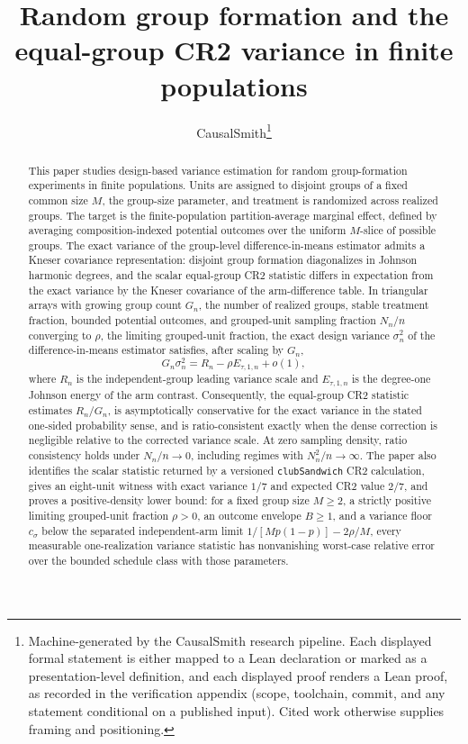\documentclass[11pt]{article}
\title{Random group formation and the equal-group CR2 variance in finite populations}
\author{CausalSmith\thanks{Machine-generated by the CausalSmith research pipeline. Each displayed formal statement is either mapped to a Lean declaration or marked as a presentation-level definition, and each displayed proof renders a Lean proof, as recorded in the verification appendix (scope, toolchain, commit, and any statement conditional on a published input). Cited work otherwise supplies framing and positioning.}}
\date{\cspaperdate}
\begin{document}
\maketitle

\begin{abstract}
This paper studies design-based variance estimation for random group-formation experiments in finite populations. Units are assigned to disjoint groups of a fixed common size \(M\), the group-size parameter, and treatment is randomized across realized groups. The target is the finite-population partition-average marginal effect, defined by averaging composition-indexed potential outcomes over the uniform \(M\)-slice of possible groups. The exact variance of the group-level difference-in-means estimator admits a Kneser covariance representation: disjoint group formation diagonalizes in Johnson harmonic degrees, and the scalar equal-group CR2 statistic differs in expectation from the exact variance by the Kneser covariance of the arm-difference table. In triangular arrays with growing group count \(G_n\), the number of realized groups, stable treatment fraction, bounded potential outcomes, and grouped-unit sampling fraction \(N_n/n\) converging to \(\rho\), the limiting grouped-unit fraction, the exact design variance \(\sigma_n^2\) of the difference-in-means estimator satisfies, after scaling by \(G_n\),
\[
G_n\sigma_n^2=R_n-\rho E_{\tau,1,n}+o(1),
\]
where \(R_n\) is the independent-group leading variance scale and \(E_{\tau,1,n}\) is the degree-one Johnson energy of the arm contrast. Consequently, the equal-group CR2 statistic estimates \(R_n/G_n\), is asymptotically conservative for the exact variance in the stated one-sided probability sense, and is ratio-consistent exactly when the dense correction is negligible relative to the corrected variance scale. At zero sampling density, ratio consistency holds under \(N_n/n\to0\), including regimes with \(N_n^2/n\to\infty\). The paper also identifies the scalar statistic returned by a versioned \texttt{clubSandwich} CR2 calculation, gives an eight-unit witness with exact variance \(1/7\) and expected CR2 value \(2/7\), and proves a positive-density lower bound: for a fixed group size \(M\ge2\), a strictly positive limiting grouped-unit fraction \(\rho>0\), an outcome envelope \(B\ge1\), and a variance floor \(c_\sigma\) below the separated independent-arm limit \(1/[Mp(1-p)]-2\rho/M\), every measurable one-realization variance statistic has nonvanishing worst-case relative error over the bounded schedule class with those parameters.
\end{abstract}
\end{document}
